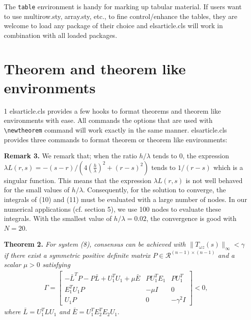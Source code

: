 \documentclass[a4paper,12pt]{article}
\def\file#1{\textsf{#1}\xspace}
\begin{document}
The \verb+table+ environment is handy for marking up tabular
material. If users want to use \file{multirow.sty},
\file{array.sty}, etc., to fine control/enhance the tables, they
are welcome to load any package of their choice and
\file{elsarticle.cls} will work in combination with all loaded
packages.

\section{Theorem and theorem like environments}
\hypertarget{theorems}{}
1
\file{elsarticle.cls} provides a few hooks to format theorems and
theorem like environments with ease. All commands the options
that are used with \verb+\newtheorem+ command will work exactly
in the same manner.  \file{elsarticle.cls} provides three
commands to format theorem or theorem like environments:

\begin{vquote}
 \newtheorem{thm}{Theorem}
 \newtheorem{lem}[thm]{Lemma}
\end{vquote}

\begin{toolwrite}{15cm}
\let\la\lambda
\noindent\textbf{Remark 3.}\enspace
We remark that; when the ratio $h/\la$ tends to 0, the expression $\la
L(r,s)=-(s-r)/(4\left(\frac{h}{\la}\right)^2+(r-s)^2)$ tends to
$1/(r-s)$ which is a singular function. This means that the expression
$\la L(r,s)$ is not well behaved for the small values of
$h/\la$. Consequently, for the solution to converge, the integrals of
(10) and (11) must be evaluated with a large number of
nodes. In our numerical applications (cf. section 5), we
use 100 nodes to evaluate these integrals. With the smallest value of
$h/\la=0.02$, the convergence is good with $N=20$.
\end{toolwrite}

\begin{toolwrite}{15cm}
\noindent\textbf{Theorem 2.}\enspace\itshape
For system (8), consensus can be achieved with
$\|T_{\omega z}(s)\|_{\infty}<\gamma$ if there exist a symmetric
positive definite
 matrix $P\in \mathcal{R}^{(n-1)\times (n-1)}$ and a scalar $\mu>0$ satisfying
\setcounter{equation}{9}
\begin{eqnarray}\label{10}
\Gamma=\begin{bmatrix}
-\bar{L}^TP-P\bar{L}+U_1^TU_1+\mu \bar{E}&PU_1^TE_1&PU_1^T\\
E_1^TU_1P&-\mu I&0\\ U_1P&0&-\gamma^2I\end{bmatrix}<0,
\end{eqnarray}
where $\bar{L}=U_1^TLU_1$ and $\bar{E}=U_1^TE_2^TE_2U_1.$
\end{toolwrite}
\end{document}
